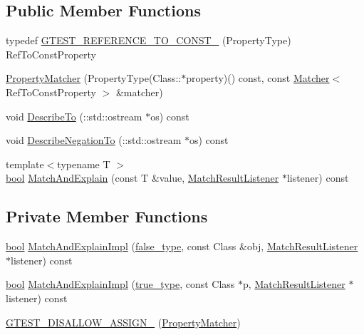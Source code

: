 \subsection*{Public Member Functions}
\begin{DoxyCompactItemize}
\item 
typedef \hyperlink{classtesting_1_1internal_1_1PropertyMatcher_aa2a26b33473de3ca6953cae490e373ec}{G\+T\+E\+S\+T\+\_\+\+R\+E\+F\+E\+R\+E\+N\+C\+E\+\_\+\+T\+O\+\_\+\+C\+O\+N\+S\+T\+\_\+} (Property\+Type) Ref\+To\+Const\+Property
\item 
\hyperlink{classtesting_1_1internal_1_1PropertyMatcher_a9b658d58f5c58d02949bb81f7e6b46ce}{Property\+Matcher} (Property\+Type(Class\+::$\ast$property)() const, const \hyperlink{classtesting_1_1Matcher}{Matcher}$<$ Ref\+To\+Const\+Property $>$ \&matcher)
\item 
void \hyperlink{classtesting_1_1internal_1_1PropertyMatcher_a075fb69f9bac8024983ab07648b8e671}{Describe\+To} (\+::std\+::ostream $\ast$os) const
\item 
void \hyperlink{classtesting_1_1internal_1_1PropertyMatcher_a2e1bc9f89f253eaa609722f39f8e6239}{Describe\+Negation\+To} (\+::std\+::ostream $\ast$os) const
\item 
{\footnotesize template$<$typename T $>$ }\\\hyperlink{classbool}{bool} \hyperlink{classtesting_1_1internal_1_1PropertyMatcher_afb672c72a70b06792027f7128dd8a1e6}{Match\+And\+Explain} (const T \&value, \hyperlink{classtesting_1_1MatchResultListener}{Match\+Result\+Listener} $\ast$listener) const
\end{DoxyCompactItemize}
\subsection*{Private Member Functions}
\begin{DoxyCompactItemize}
\item 
\hyperlink{classbool}{bool} \hyperlink{classtesting_1_1internal_1_1PropertyMatcher_aee28dd64a2896159661a4f3ad3329ffd}{Match\+And\+Explain\+Impl} (\hyperlink{namespacetesting_1_1internal_abb1d0789f19bdde21affccbd1078b525}{false\+\_\+type}, const Class \&obj, \hyperlink{classtesting_1_1MatchResultListener}{Match\+Result\+Listener} $\ast$listener) const
\item 
\hyperlink{classbool}{bool} \hyperlink{classtesting_1_1internal_1_1PropertyMatcher_a6c8caccbd97d5083c322fc0d8579c2d3}{Match\+And\+Explain\+Impl} (\hyperlink{namespacetesting_1_1internal_a62f917c3424d8841de9b49b5ec28edb4}{true\+\_\+type}, const Class $\ast$p, \hyperlink{classtesting_1_1MatchResultListener}{Match\+Result\+Listener} $\ast$listener) const
\item 
\hyperlink{classtesting_1_1internal_1_1PropertyMatcher_a23435ada665926210b4f28641579d20d}{G\+T\+E\+S\+T\+\_\+\+D\+I\+S\+A\+L\+L\+O\+W\+\_\+\+A\+S\+S\+I\+G\+N\+\_\+} (\hyperlink{classtesting_1_1internal_1_1PropertyMatcher}{Property\+Matcher})
\end{DoxyCompactItemize}
